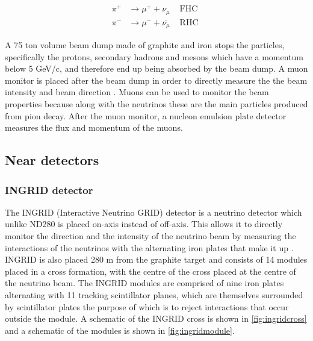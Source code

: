 \begin{equation}
\begin{array}{lll}
\pi^{+} & \longrightarrow \mu^{+}+\nu_{\mu} & \text { FHC } \\
\pi^{-} & \longrightarrow \mu^{-}+\overline{\nu_{\mu}} & \text { RHC }
\end{array}
\label{eq:nubeam}
\end{equation}

A 75 ton volume beam dump made of graphite and iron stops the particles, specifically the protons, secondary hadrons and mesons which have a momentum below 5 GeV/c, and therefore end up being absorbed by the beam dump. A muon monitor is placed after the beam dump in order to directly measure the the beam intensity and beam direction \cite{matsuoka2010design}. Muons can be used to monitor the beam properties because along with the neutrinos these are the main particles produced from pion decay. After the muon monitor, a nucleon emulsion plate detector measures the flux and momentum of the muons. 

\subsection{Near detectors}

\subsubsection{INGRID detector}

The INGRID (Interactive Neutrino GRID) detector is a neutrino detector which unlike ND280 is placed on-axis instead of off-axis. This allows it to directly monitor the direction and the intensity of the neutrino beam by measuring the interactions of the neutrinos with the alternating iron plates that make it up \cite{otani2008design}. INGRID is also placed 280 m from the graphite target and consists of 14 modules placed in a cross formation, with the centre of the cross placed at the centre of the neutrino beam. The INGRID modules are comprised of nine iron plates alternating with 11 tracking scintillator planes, which are themselves surrounded by scintillator plates the purpose of which is to reject interactions that occur outside the module. A schematic of the INGRID cross is shown in \ref{fig:ingridcross} and a schematic of the modules is shown in \ref{fig:ingridmodule}. 

